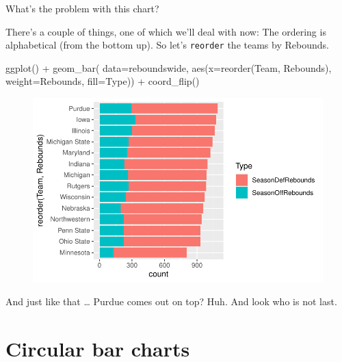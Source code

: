 \documentclass[
  letterpaper,
  DIV=11,
  numbers=noendperiod]{scrreprt}
\newenvironment{Shaded}{\begin{snugshade}}{\end{snugshade}}
\newcommand{\AttributeTok}[1]{\textcolor[rgb]{0.40,0.45,0.13}{#1}}
\newcommand{\FunctionTok}[1]{\textcolor[rgb]{0.28,0.35,0.67}{#1}}
\newcommand{\NormalTok}[1]{\textcolor[rgb]{0.00,0.23,0.31}{#1}}
\newcommand{\SpecialCharTok}[1]{\textcolor[rgb]{0.37,0.37,0.37}{#1}}
\begin{document}
What's the problem with this chart?

There's a couple of things, one of which we'll deal with now: The
ordering is alphabetical (from the bottom up). So let's \texttt{reorder}
the teams by Rebounds.

\begin{Shaded}
\begin{Highlighting}[]
\FunctionTok{ggplot}\NormalTok{() }\SpecialCharTok{+} 
  \FunctionTok{geom\_bar}\NormalTok{(}
    \AttributeTok{data=}\NormalTok{reboundswide, }
    \FunctionTok{aes}\NormalTok{(}\AttributeTok{x=}\FunctionTok{reorder}\NormalTok{(Team, Rebounds), }
        \AttributeTok{weight=}\NormalTok{Rebounds, }
        \AttributeTok{fill=}\NormalTok{Type)) }\SpecialCharTok{+} 
  \FunctionTok{coord\_flip}\NormalTok{()}
\end{Highlighting}
\end{Shaded}

\begin{figure}[H]

{\centering \includegraphics{./stackedbars_files/figure-pdf/unnamed-chunk-9-1.pdf}

}

\end{figure}

And just like that \ldots{} Purdue comes out on top? Huh. And look who
is not last.


\hypertarget{circular-bar-charts}{%
\chapter{Circular bar charts}\label{circular-bar-charts}}
\end{document}
